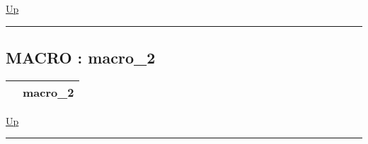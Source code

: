 \hyperlink{ecldoc:example}{Up}

\par


\rule{\textwidth}{0.4pt}
\subsection*{MACRO : macro\_2}
\hypertarget{ecldoc:example.macro_2}{}

{\renewcommand{\arraystretch}{1.5}
\begin{tabularx}{\textwidth}{|>{\raggedright\arraybackslash}l|X|}
\hline
\hspace{0pt} & macro\_2 \\
\hline
\end{tabularx}
}

\hyperlink{ecldoc:example}{Up}

\par


\rule{\textwidth}{0.4pt}



